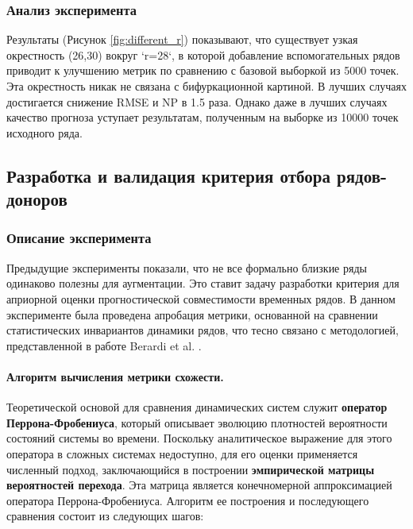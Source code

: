 \documentclass[a4paper,12pt]{extarticle}
\begin{document}
\subsubsection{Анализ эксперимента}

Результаты (Рисунок \ref{fig:different_r}) показывают, что существует узкая окрестность (26,30)
 вокруг `r=28`, в которой добавление вспомогательных рядов приводит к
  улучшению метрик по сравнению с базовой выборкой из 5000 точек. Эта окрестность
  никак не связана с бифуркационной картиной.
  В лучших случаях достигается снижение RMSE и NP в 1.5 раза.
   Однако даже в лучших случаях качество прогноза уступает результатам,
    полученным на выборке из 10000 точек исходного ряда.


\subsection{Разработка и валидация критерия отбора рядов-доноров}

\subsubsection{Описание эксперимента}
Предыдущие эксперименты показали, что не все формально близкие ряды одинаково
 полезны для аугментации. Это ставит задачу разработки критерия для априорной 
 оценки прогностической совместимости временных рядов. В данном эксперименте
  была проведена апробация метрики, основанной на сравнении статистических инвариантов
   динамики рядов, что тесно связано с методологией, представленной в работе Berardi et al. \cite{Berardi2018}.

\paragraph{Алгоритм вычисления метрики схожести.}
Теоретической основой для сравнения динамических систем служит \textbf{оператор Перрона-Фробениуса}, который описывает эволюцию плотностей вероятности состояний системы во времени. Поскольку аналитическое выражение для этого оператора в сложных системах недоступно, для его оценки применяется численный подход, заключающийся в построении \textbf{эмпирической матрицы вероятностей перехода}. Эта матрица является конечномерной аппроксимацией оператора Перрона-Фробениуса. Алгоритм ее построения и последующего сравнения состоит из следующих шагов:
\end{document}

